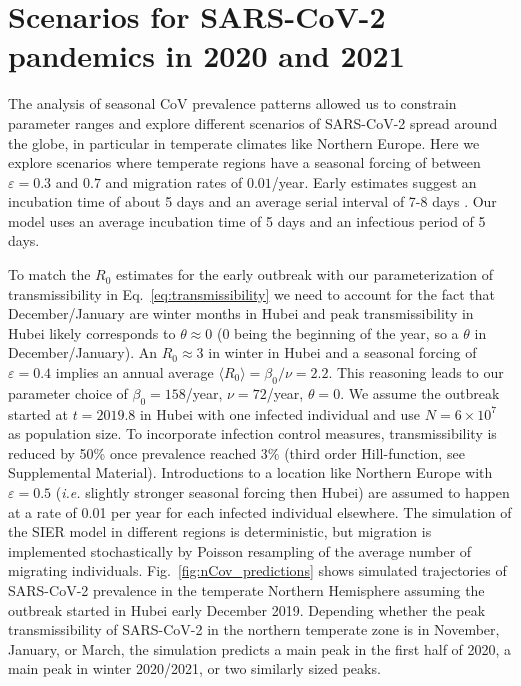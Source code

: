 \documentclass[rmp, reprint, superscriptaddress, floatfix,amsmath]{revtex4-1}
\newcommand{\forcing}{\varepsilon}
\begin{document}
\section{Scenarios for SARS-CoV-2 pandemics in 2020 and 2021}
\label{section:sars_pandemic_regional}
The analysis of seasonal CoV prevalence patterns allowed us to constrain parameter ranges and explore different scenarios of SARS-CoV-2 spread around the globe, in particular in temperate climates like Northern Europe. 
Here we explore scenarios where temperate regions have a seasonal forcing of between $\forcing=0.3$ and $0.7$ and migration rates of $0.01$/year. 
Early estimates suggest an incubation time of about 5 days and an average serial interval of 7-8 days \citep{wu_nowcasting_2020}.
Our model uses an average incubation time of 5 days \citep{backer_incubation_2020} and an infectious period of 5 days.

To match the $R_0$ estimates for the early outbreak with our parameterization of transmissibility in Eq.~\ref{eq:transmissibility} we need to account for the fact that December/January are winter months in Hubei and peak transmissibility in Hubei likely corresponds to $\theta\approx 0$ (0 being the beginning of the year, so a $\theta$ in December/January). An $R_0\approx 3$ in winter in Hubei and a seasonal forcing of $\forcing=0.4$ implies an annual average $\langle R_0\rangle = \beta_0/\nu=2.2$.
This reasoning leads to our parameter choice of $\beta_0=158$/year, $\nu=72$/year, $\theta=0$. 
We assume the outbreak started at $t=2019.8$ in Hubei with one infected individual and use $N=6\times 10^{7}$ as population size.
To incorporate infection control measures, transmissibility is reduced by 50\% once prevalence reached 3\% (third order Hill-function, see Supplemental Material).
Introductions to a location like Northern Europe with $\forcing=0.5$ (\textit{i.e.} slightly stronger seasonal forcing then Hubei) are assumed to happen at a rate of 0.01 per year for each infected individual elsewhere.
The simulation of the SIER model in different regions is deterministic, but migration is implemented stochastically by Poisson resampling of the average number of migrating individuals. 
Fig.~\ref{fig:nCov_predictions} shows simulated trajectories of SARS-CoV-2 prevalence in the temperate Northern Hemisphere assuming the outbreak started in Hubei early December 2019.
Depending whether the peak transmissibility of SARS-CoV-2 in the northern temperate zone is in November, January, or March, the simulation predicts a main peak in the first half of 2020, a main peak in winter 2020/2021, or two similarly sized peaks.
\end{document}
